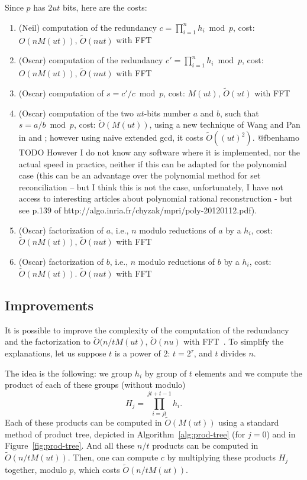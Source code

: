 \documentclass[11pt]{llncs}
\newcommand{\Oapp}{\ensuremath{\tilde{O}}}
\begin{document}
Since $p$ has $2 u t$ bits, here are the costs:
\begin{enumerate}
\item (Neil) computation of the redundancy $c=\prod_{i=1}^n h_i \bmod p$, cost: $O(n M(u t))$, $\Oapp(n u t)$ with FFT
\item (Oscar) computation of the redundancy $c'=\prod_{i=1}^n h_i \bmod p$, cost: $O(n M(u t))$, $\Oapp(n u t)$ with FFT
\item (Oscar) computation of $s = c' / c \bmod p$, cost: $M(u t)$, $\Oapp(u t)$ with FFT
\item (Oscar) computation of the two $u t$-bits number $a$ and $b$, such that $s = a / b \bmod p$, cost: $\Oapp(M(u t))$, using a new technique of Wang and Pan in \cite{pan2004rational} and \cite{wang2003acceleration}; however using naive extended gcd, it costs $\Oapp((u t)^2)$.
@fbenhamo TODO However I do not know any software where it is implemented, nor the actual speed in practice, neither if this can be adapted for the polynomial case (this can be an advantage over the polynomial method for set reconciliation -- but I think this is not the case, unfortunately, I have not access to interesting articles about polynomial rational reconstruction - but see p.139 of http://algo.inria.fr/chyzak/mpri/poly-20120112.pdf).
\item (Oscar) factorization of $a$, i.e., $n$ modulo reductions of $a$ by a $h_i$, cost: $\Oapp(n M(u t))$, $\Oapp(n u t)$ with FFT
\item (Oscar) factorization of $b$, i.e., $n$ modulo reductions of $b$ by a $h_i$, cost: $\Oapp(n M(u t))$. $\Oapp(n u t)$ with FFT
\end{enumerate}

\subsection{Improvements}

It is possible to improve the complexity of the computation of the redundancy and the factorization to $\Oapp(n/t M(u t)$, $\Oapp(n u)$ with FFT~\cite{schonhage1971schnelle}.
To simplify the explanations, let us suppose $t$ is a power of $2$: $t=2^\tau$, and $t$ divides $n$.

The idea is the following: we group $h_i$ by group of $t$ elements and we compute the product of each of these groups (without modulo)
\[ H_j = \prod_{i=j t}^{j t + t - 1} h_i. \]
Each of these products can be computed in $\Oapp(M(u t))$ using a standard method of product tree, depicted in Algorithm~\ref{alg:prod-tree} (for $j=0$) and in Figure~\ref{fig:prod-tree}.
And all these $n / t$ products can be computed in $\Oapp(n/t M(u t))$.
Then, one can compute $c$ by multiplying these products $H_j$ together, modulo $p$, which costs $\Oapp(n/t M(u t))$.
\end{document}
